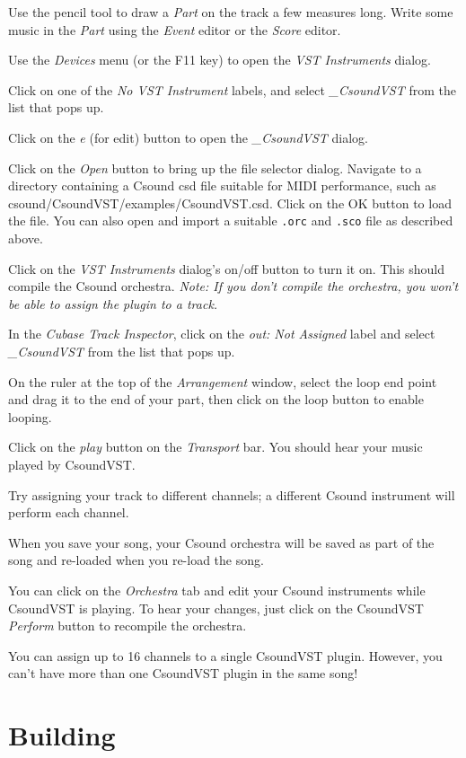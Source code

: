 \documentclass[10pt,letterpaper,onecolumn]{ltxguide}
\begin{document}
Use the pencil tool to draw a \emph{Part} on the track a few measures long. Write some music in the \emph{Part} using the \emph{Event} editor or the \emph{Score} editor. 

Use the \emph{Devices} menu (or the F11 key) to open the \emph{VST Instruments} dialog. 

Click on one of the \emph{No VST Instrument} labels, and select \emph{\_CsoundVST} from the list that pops up. 

Click on the \emph{e} (for edit) button to open the \emph{\_CsoundVST} dialog. 

Click on the \emph{Open} button to bring up the file selector dialog. Navigate to a directory containing a Csound csd file suitable for MIDI performance, such as csound/CsoundVST/examples/CsoundVST.csd. Click on the OK button to load the file. You can also open and import a suitable \texttt{.orc} and \texttt{.sco} file as described above. 

Click on the \emph{VST Instruments} dialog's on/off button to turn it on. This should compile the Csound orchestra. \emph{Note: If you don't compile the orchestra, you won't be able to assign the plugin to a track.} 

In the \emph{Cubase Track Inspector}, click on the \emph{out: Not Assigned} label and select \emph{\_CsoundVST} from the list that pops up. 

On the ruler at the top of the \emph{Arrangement} window, select the loop end point and drag it to the end of your part, then click on the loop button to enable looping. 

Click on the \emph{play} button on the \emph{Transport} bar. You should hear your music played by CsoundVST. 

Try assigning your track to different channels; a different Csound instrument will perform each channel. 

When you save your song, your Csound orchestra will be saved as part of the song and re-loaded when you re-load the song. 

You can click on the \emph{Orchestra} tab and edit your Csound instruments while CsoundVST is playing. To hear your changes, just click on the CsoundVST \emph{Perform} button to recompile the orchestra. 

You can assign up to 16 channels to a single CsoundVST plugin. However, you can't have more than one CsoundVST plugin in the same song! 

\section{Building}
\end{document}
